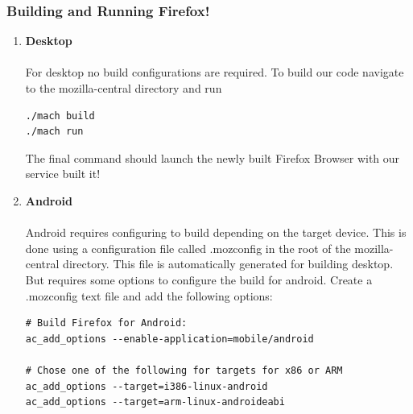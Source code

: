 \documentclass[12pt]{article}
\begin{document}
\subsubsection{Building and Running Firefox!}
	\begin{enumerate}
		\item \textbf{Desktop} \\ \\
		For desktop no build configurations are required.  To build our code navigate to the mozilla-central directory and run
\begin{lstlisting}[style=BashInputStyle]
./mach build
./mach run
\end{lstlisting}
The final command should launch the newly built Firefox Browser with our service built it!
		\item \textbf{Android} \\ \\
		Android requires configuring to build depending on the target device.  	This is done using a configuration file called .mozconfig in the root of the mozilla-central directory.  This file is automatically generated for building desktop.  But requires some options to configure the build for android.  Create a .mozconfig text file and add the following options:
		
		\begin{lstlisting}[style=BashInputStyle]
# Build Firefox for Android:
ac_add_options --enable-application=mobile/android

# Chose one of the following for targets for x86 or ARM
ac_add_options --target=i386-linux-android
ac_add_options --target=arm-linux-androideabi


\end{lstlisting}
\end{enumerate}
\end{document}
